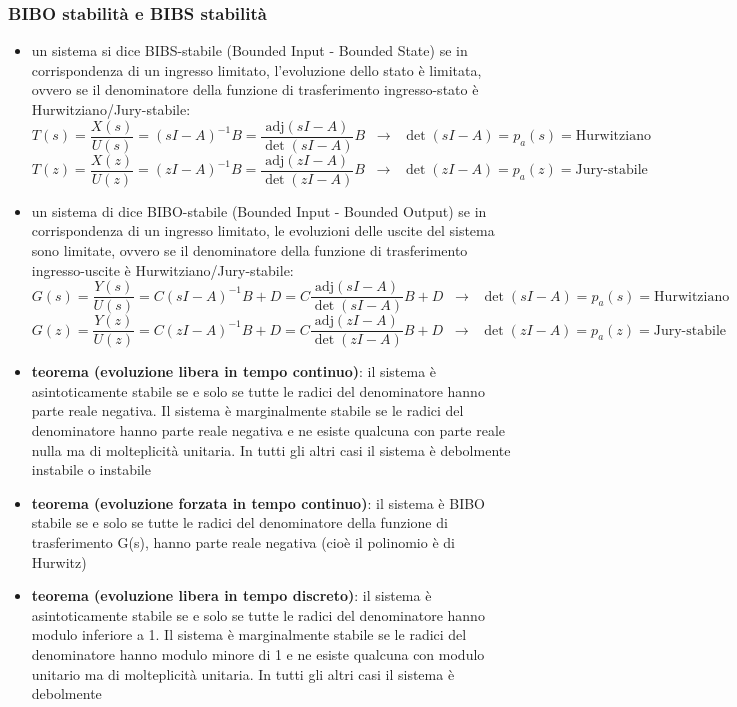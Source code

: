 \subsubsection*{BIBO stabilità e BIBS stabilità}
\begin{itemize}
	\item un sistema si dice BIBS-stabile (Bounded Input - Bounded State) se in corrispondenza di un ingresso limitato,
	l'evoluzione dello stato è limitata, ovvero se il denominatore della funzione di trasferimento ingresso-stato è
	Hurwitziano/Jury-stabile:
	\[T(s) = \frac{X(s)}{U(s)} = (sI-A)^{-1}B = \frac{\text{adj}(sI-A)}{\det{(sI-A)}}B \;\; \rightarrow \;\; \det{(sI-A)} = p_a(s) = \text{Hurwitziano}\]
	\[T(z) = \frac{X(z)}{U(z)} = (zI-A)^{-1}B = \frac{\text{adj}(zI-A)}{\det{(zI-A)}}B \;\; \rightarrow \;\; \det{(zI-A)} = p_a(z) = \text{Jury-stabile}\]
	\item un sistema di dice BIBO-stabile (Bounded Input - Bounded Output) se in corrispondenza di un ingresso limitato,
	le evoluzioni delle uscite del sistema sono limitate, ovvero se il denominatore della funzione di trasferimento
	ingresso-uscite è Hurwitziano/Jury-stabile:
	\[G(s) = \frac{Y(s)}{U(s)} = C(sI-A)^{-1}B + D = C\frac{\text{adj}(sI-A)}{\det{(sI-A)}}B + D \;\; \rightarrow \;\; \det{(sI-A)} = p_a(s) = \text{Hurwitziano}\]
	\[G(z) = \frac{Y(z)}{U(z)} = C(zI-A)^{-1}B + D = C\frac{\text{adj}(zI-A)}{\det{(zI-A)}}B + D \;\; \rightarrow \;\; \det{(zI-A)} = p_a(z) = \text{Jury-stabile}\]
	\item \textbf{teorema (evoluzione libera in tempo continuo)}: il sistema è asintoticamente stabile se e solo se tutte le radici
	del denominatore hanno parte reale negativa. Il sistema è marginalmente stabile se le radici del denominatore hanno parte reale
	negativa e ne esiste qualcuna con parte reale nulla ma di molteplicità unitaria. In tutti gli altri casi il sistema è debolmente
	instabile o instabile
	\item \textbf{teorema (evoluzione forzata in tempo continuo)}: il sistema è BIBO stabile se e solo se tutte le radici del
	denominatore della funzione di trasferimento G(s), hanno parte reale negativa (cioè il polinomio è di Hurwitz)
	\item \textbf{teorema (evoluzione libera in tempo discreto)}: il sistema è asintoticamente stabile se e solo se tutte le radici
	del denominatore hanno modulo inferiore a 1. Il sistema è marginalmente stabile se le radici del denominatore hanno modulo minore
	di 1 e ne esiste qualcuna con modulo unitario ma di molteplicità unitaria. In tutti gli altri casi il sistema è debolmente

\end{itemize}
